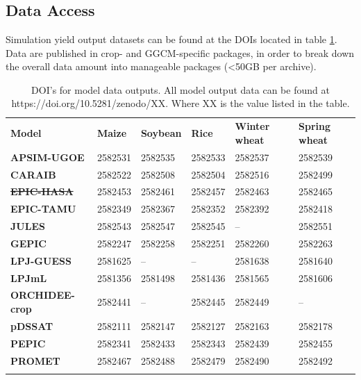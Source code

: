 \documentclass[gmd, manuscript]{copernicus} %
\providecommand{\DIFadd}[1]{{\protect\color{blue}\uwave{#1}}} %
\providecommand{\DIFdel}[1]{{\protect\color{red}\sout{#1}}}                      %
\providecommand{\DIFaddFL}[1]{\DIFadd{#1}} %
\providecommand{\DIFdelFL}[1]{\DIFdel{#1}} %
\providecommand{\DIFaddbeginFL}{} %
\providecommand{\DIFaddendFL}{} %
\providecommand{\DIFdelbeginFL}{} %
\providecommand{\DIFdelendFL}{} %
\begin{document}
\appendix
\section{}
\subsection{Data Access}
\label{A:1}
Simulation yield output datasets can be found at the DOIs located in table \ref{table:dataloc}. 
Data are published in crop- and GGCM-specific packages, in order to break down the overall data amount into manageable packages (<50GB per archive).

\begin{table}[h]
  \caption{DOI's for model data outputs. All model output data can be found at https://doi.org/10.5281/zenodo/XX. Where XX is the value listed in the table.} 
  \label{table:dataloc}
  \begin{tabular}{p{3cm} p{1.5cm} p{1.5cm} p{1.5cm} p{1.5cm} p{1.5cm}}
    \tophline
    {\textbf{Model}}&{\textbf{Maize}}&{\textbf{Soybean}}&{\textbf{Rice}}&{\textbf{Winter wheat}}&{\textbf{Spring wheat}}\\ \middlehline
    {\textbf{APSIM-UGOE}} & {2582531} & {2582535} & {2582533} & {2582537} & {2582539}\\ \middlehline
    {\textbf{CARAIB}} & {2582522} & {2582508} & {2582504} & {2582516} & {2582499}\\ \middlehline
    {\textbf{\DIFdelbeginFL \DIFdelFL{EPIC-IIASA}\DIFdelendFL \DIFaddbeginFL \DIFaddFL{EPIC-2ASA}\DIFaddendFL }} & {2582453} & {2582461} & {2582457} & {2582463} & {2582465}\\  \middlehline
    {\textbf{EPIC-TAMU}} & {2582349} & {2582367} & {2582352} & {2582392} & {2582418}\\ \middlehline
    {\textbf{JULES}} & {2582543} & {2582547} & {2582545} & {--} & {2582551}\\ \middlehline
    {\textbf{GEPIC}} & {2582247} & {2582258} & {2582251} & {2582260} & {2582263}\\ \middlehline
    {\textbf{LPJ-GUESS}} & {2581625} & {--} & {--} & {2581638} & {2581640}\\  \middlehline
    {\textbf{LPJmL}} & {2581356} & {2581498} & {2581436} & {2581565} & {2581606}\\ \middlehline
    {\textbf{ORCHIDEE-crop}} & {2582441} & {--} & {2582445} & {2582449} & {--}\\ \middlehline
    {\textbf{pDSSAT}} & {2582111} & {2582147} & {2582127} & {2582163} & {2582178}\\ \middlehline
    {\textbf{PEPIC}} & {2582341} & {2582433} & {2582343} & {2582439} & {2582455}\\ \middlehline
    {\textbf{PROMET}} & {2582467} & {2582488} & {2582479} & {2582490} & {2582492}\\
    \bottomhline
  \end{tabular}
\end{table}
\noappendix %
\end{document}
